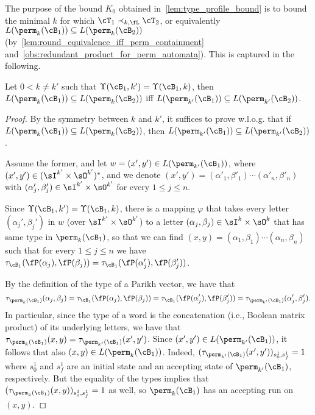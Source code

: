 The purpose of the bound $K_0$ obtained in~\cref{lem:type_profile_bound} is to bound the minimal $k$ for which $\cT_1\prec_{k,\fL} \cT_2$, or equivalently $L(\perm_{k}(\cB_1))\subseteq L(\perm_{k}(\cB_2))$ (by~\cref{lem:round_equivalence_iff_perm_containment} and~\cref{obs:redundant_product_for_perm_automata}).
This is captured in the following.

\begin{lemma}
	\label{lem:profile_equality_to_simulation}
	Let $0<k\neq k'$ such that $\Upsilon(\cB_1,k')=\Upsilon(\cB_1,k)$, then
	$L(\perm_{k}(\cB_1))\subseteq L(\perm_{k}(\cB_2))$ iff $L(\perm_{k'}(\cB_1))\subseteq L(\perm_{k'}(\cB_2))$.
\end{lemma}
\begin{proof}

By the symmetry between $k$ and $k'$, it suffices to prove w.l.o.g. that if $L(\perm_{k}(\cB_1))\subseteq L(\perm_{k}(\cB_2))$, then $L(\perm_{k'}(\cB_1))\subseteq L(\perm_{k'}(\cB_2))$.

Assume the former, and let $w=(x',y')\in L(\perm_{k'}(\cB_1))$, where $(x',y')\in (\sI^{k'}\times \sO^{k'})^*$, and we denote $(x',y')=(\alpha'_1,\beta'_1)\cdots (\alpha'_n,\beta'_n)$ with $(\alpha'_j,\beta'_j)\in \sI^{k'}\times \sO^{k'}$ for every $1\le j\le n$. 

Since $\Upsilon(\cB_1,k')=\Upsilon(\cB_1,k)$, there is a mapping $\varphi$ that takes every letter $(\alpha_j',\beta_j')$ in $w$ (over $\sI^{k'}\times \sO^{k'}$) to a letter $(\alpha_j,\beta_j)\in\sI^{k}\times \sO^{k}$ that has same type in $\perm_{k}(\cB_1)$, so that we can find $(x,y)=(\alpha_1,\beta_1)\cdots (\alpha_n,\beta_n)$ such that for every $1\le j\le n$ we have $\tau_{\cB_1}(\fP(\alpha_j),\fP(\beta_j))=\tau_{\cB_1}(\fP(\alpha'_j),\fP(\beta'_j))$. 

By the definition of the type of a Parikh vector, we have that \[\tau_{\perm_k(\cB_1)}(\alpha_j,\beta_j)=\tau_{\cB_1}(\fP(\alpha_j),\fP(\beta_j))=\tau_{\cB_1}(\fP(\alpha'_j),\fP(\beta'_j))=\tau_{\perm_{k'}(\cB_1)}(\alpha'_j,\beta'_j).\]
In particular, since the type of a word is the concatenation (i.e., Boolean matrix product) of its underlying letters, we have that $\tau_{\perm_k(\cB_1)}(x,y)=\tau_{\perm_{k'}(\cB_1)}(x',y')$. Since $(x',y')\in L(\perm_{k'}(\cB_1))$, it follows that also $(x,y)\in L(\perm_{k}(\cB_1))$. Indeed, 
$(\tau_{\perm_{k'}(\cB_1)}(x',y'))_{s^1_0,s^1_f}=1$ where $s^1_0$ and $s^1_f$ are an initial state and an accepting state of $\perm_{k'}(\cB_1)$, respectively. But the equality of the types implies that $(\tau_{\perm_{k}(\cB_1)}(x,y))_{s^1_0,s^1_f}=1$ as well, so $\perm_k(\cB_1)$ has an accepting run on $(x,y)$.


\end{proof}
